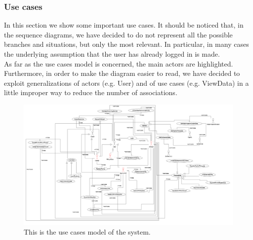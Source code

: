 \documentclass{article}
\begin{document}
\newpage
\subsubsection{Use cases}
In this section we show some important use cases. It should be noticed that, in the sequence diagrams, we have decided to do not represent all the possible branches and situations, but only the most relevant. In particular, in many cases the underlying assumption that the user has already logged in is made.\\
As far as the use cases model is concerned, the main actors are highlighted. Furthermore, in order to make the diagram easier to read, we have decided to exploit generalizations of actors (e.g. User) and of use cases (e.g. ViewData) in a little improper way to reduce the number of associations.
\newpage
\clearpage
\begin{figure}
    \centering
    \includegraphics[scale=0.75]{use cases model/use cases model.png}
    \caption{This is the use cases model of the system.}
\end{figure}
\clearpage
\newpage
\centering
\end{document}
